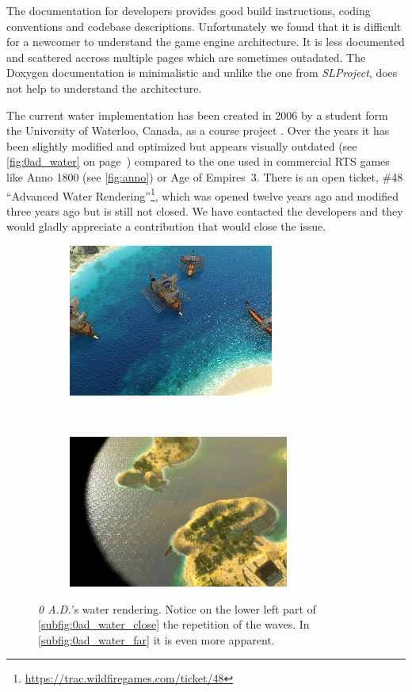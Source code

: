 The documentation for developers provides good build instructions, coding
conventions and codebase descriptions. Unfortunately we found that it is
difficult for a newcomer to understand the game engine architecture. It is less
documented and scattered accross multiple pages which are sometimes outadated.
The Doxygen documentation is minimalistic and unlike the one from
\textit{SLProject}, does not help to understand the architecture.

The current water implementation has been created in 2006 by a student form the
University of Waterloo, Canada, as a course project \autocite{zaharia2006cs}.
Over the years it has been slightly modified and optimized but appears visually
outdated (see \autoref{fig:0ad_water} on page~\pageref{fig:0ad_water}) compared
to the one used in commercial RTS games like Anno 1800 (see
\autoref{fig:anno}) or Age of Empires~3. There is an open ticket, \#48
``Advanced Water
Rendering''\footnote{\url{https://trac.wildfiregames.com/ticket/48}}, which was
opened twelve years ago and modified three years ago but is still not closed.
We have contacted the developers and they would gladly appreciate a contribution
that would close the issue.

\begin{figure}[ht!]
    \centering
    \begin{subfigure}[ht]{\textwidth}
        \centering
        \includegraphics[height=5cm]{figures/0ad_water-specular.jpg}
        \label{subfig:0ad_water_close}
    \end{subfigure}\\%
    \begin{subfigure}[ht]{\textwidth}
        \centering
        \includegraphics[height=5cm]{figures/0ad_cycladic_arcgipelago_6.jpg}
        \label{subfig:0ad_water_far}
    \end{subfigure}
    \caption{\textit{0 A.D.}'s water rendering. Notice on the lower left part
        of \autoref{subfig:0ad_water_close} the repetition of the waves.
        In \autoref{subfig:0ad_water_far} it is even more apparent.}\label{fig:0ad_water}
\end{figure}
